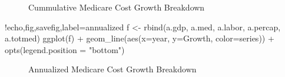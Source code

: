 \documentclass{article}
\begin{document}
\begin{figure}[h]
\centering
{}
\caption{Cummulative Medicare Cost Growth Breakdown}
\label{fig:cummulative}
\end{figure}

\begin{Rcode}{!echo,fig,savefig,label=annualized}
f <- rbind(a.gdp, a.med, a.labor, a.percap, a.totmed)
ggplot(f) + geom_line(aes(x=year, y=Growth, color=series)) + opts(legend.position = "bottom")
\end{Rcode}

\begin{figure}[h]
\centering
{}
\caption{Annualized Medicare Cost Growth Breakdown}
\label{fig:annualized}
\end{figure}
\end{document}
